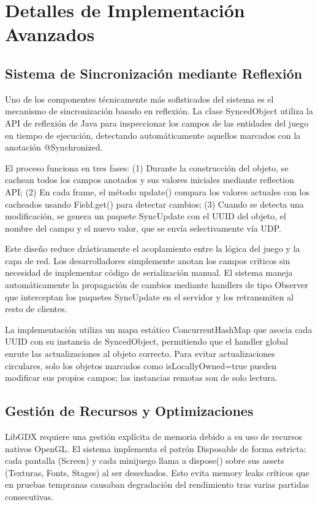 \documentclass[conference]{IEEEtran}
\begin{document}
\section{Detalles de Implementación Avanzados}

\subsection{Sistema de Sincronización mediante Reflexión}

Uno de los componentes técnicamente más sofisticados del sistema es el mecanismo de sincronización basado en reflexión. La clase SyncedObject utiliza la API de reflexión de Java para inspeccionar los campos de las entidades del juego en tiempo de ejecución, detectando automáticamente aquellos marcados con la anotación @Synchronized.

El proceso funciona en tres fases: (1) Durante la construcción del objeto, se cachean todos los campos anotados y sus valores iniciales mediante reflection API; (2) En cada frame, el método update() compara los valores actuales con los cacheados usando Field.get() para detectar cambios; (3) Cuando se detecta una modificación, se genera un paquete SyncUpdate con el UUID del objeto, el nombre del campo y el nuevo valor, que se envía selectivamente vía UDP.

Este diseño reduce drásticamente el acoplamiento entre la lógica del juego y la capa de red. Los desarrolladores simplemente anotan los campos críticos sin necesidad de implementar código de serialización manual. El sistema maneja automáticamente la propagación de cambios mediante handlers de tipo Observer que interceptan los paquetes SyncUpdate en el servidor y los retransmiten al resto de clientes.

La implementación utiliza un mapa estático ConcurrentHashMap que asocia cada UUID con su instancia de SyncedObject, permitiendo que el handler global enrute las actualizaciones al objeto correcto. Para evitar actualizaciones circulares, solo los objetos marcados como isLocallyOwned=true pueden modificar sus propios campos; las instancias remotas son de solo lectura.

\subsection{Gestión de Recursos y Optimizaciones}

LibGDX requiere una gestión explícita de memoria debido a su uso de recursos nativos OpenGL. El sistema implementa el patrón Disposable de forma estricta: cada pantalla (Screen) y cada minijuego llama a dispose() sobre sus assets (Texturas, Fonts, Stages) al ser desechados. Esto evita memory leaks críticos que en pruebas tempranas causaban degradación del rendimiento tras varias partidas consecutivas.
\end{document}
